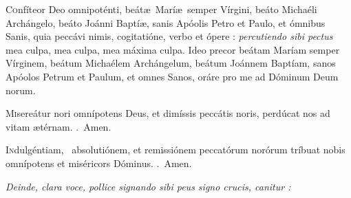 \documentclass[12pt]{article} %
\def\noinitial{%
\gresetfirstlineaboveinitial{\textcolor{benred8}{\small \textsc{\textbf{}}}}{\textcolor{benred8}{\small \textsc{\textbf{}}}}
\setspaceafterinitial{0pt plus 0em minus 0em}%
\setspacebeforeinitial{0pt plus 0em minus 0em}%
\relax %
}
\newenvironment{rubric}{\vspace{1 mm}\color{benred8} \itshape \leftskip 0in \setlength{\parindent}{0.25in}}{\vspace{1 mm}}
\newenvironment{response}{\leftskip 0in \setlength{\parindent}{0in}}{\vspace{1 mm}}
\let\oldRbar\Rbar
\renewcommand{\Rbar}{\textcolor{benred8}{\oldRbar .}}
\let\oldgrealtcross\grealtcross
\renewcommand{\grealtcross}{\textcolor{benred8}{\oldgrealtcross}}
\begin{document}
\begin{pages}
\begin{Leftside}
\begin{rubric}
\end{rubric}

\pend\pstart

\begin{response}\lettrine{C}{o}nf\'{i}teor Deo omnipot\'{e}nti, be\'{a}t\ae\ Mar\'{i}\ae\ semper V\'{i}rgini, be\'{a}to Micha\'{e}li Arch\'{a}ngelo, be\'{a}to Jo\'{a}nni Bapt\'{i}\ae , sanis Ap\'{o}olis Petro et Paulo, et \'{o}mnibus Sanis, quia pecc\'{a}vi nimis, cogitati\'{o}ne, verbo et \'{o}pere : \emph{\textcolor{benred8}{percutiendo sibi pectus}} mea culpa, mea culpa, mea m\'{a}xima culpa. Ideo precor be\'{a}tam Mar\'{i}am semper V\'{i}rginem, be\'{a}tum Micha\'{e}lem Arch\'{a}ngelum, be\'{a}tum Jo\'{a}nnem Bapt\'{i}am, sanos Ap\'{o}olos Petrum et Paulum, et omnes Sanos, or\'{a}re pro me ad D\'{o}minum Deum norum.

\end{response}

\pend\pstart

\begin{response}\lettrine{M}{i}sere\'{a}tur nori omn\'{i}potens Deus, et dim\'{i}ssis pecc\'{a}tis noris, perd\'{u}cat nos ad vitam \ae t\'{e}rnam. \Rbar\ Amen.

\end{response}

\pend\pstart

\begin{response}\lettrine{I}{n}dulg\'{e}ntiam, \grealtcross\ absoluti\'{o}nem, et remissi\'{o}nem peccat\'{o}rum nor\'{o}rum tr\'{i}buat nobis omn\'{i}potens et mis\'{e}ricors D\'{o}minus. \Rbar\ Amen.

\end{response}

\pend\pstart

\begin{rubric}
Deinde, clara voce, pollice signando sibi peus signo crucis, canitur :

\end{rubric}

\pend\pstart

{\noinitial
{}

}

\pend\pstart


\end{Leftside}
\end{pages}
\end{document}
